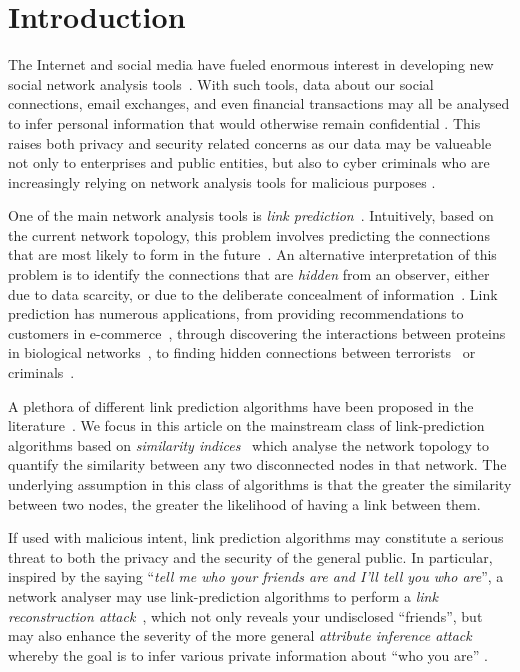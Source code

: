 \documentclass[twocolumn]{article}
\begin{document}
\section*{Introduction}
The Internet and social media have fueled enormous interest in developing new social network analysis tools~\cite{scott2012social}.
With such tools, data about our social connections, email exchanges, and even financial transactions may all be analysed to infer personal information that would otherwise remain confidential \cite{bird2006mining}. This raises both privacy and security related concerns as our data may be valueable not only to enterprises and public entities, but also to cyber criminals who are increasingly relying on network analysis tools for malicious purposes \cite{altshuler2013stealing}. 

One of the main network analysis tools is \textit{link prediction}~\cite{liben2007link,lu2011link}. Intuitively, based on the current network topology, this problem involves predicting the connections that are most likely to form in the future~\cite{liben2007link}. An alternative interpretation of this problem is to identify the connections that are \textit{hidden} from an observer, either due to data scarcity, or due to the deliberate concealment of information~\cite{brantingham2011co}. Link prediction has numerous applications, from providing recommendations to customers in e-commerce~\cite{crone2005predicting}, through discovering the interactions between proteins in biological networks~\cite{cannistraci2013link}, to finding hidden connections between terrorists~\cite{al2006link} or criminals~\cite{tayebi2011locating}. 

A plethora of different link prediction algorithms have been proposed in the literature~\cite{liben2007link,lu2011link,al2011survey}.
We focus in this article on the mainstream class of link-prediction algorithms based on \textit{similarity indices}~\cite{lu2011link} which analyse the network topology to quantify the similarity between any two disconnected nodes in that network. The underlying assumption in this class of algorithms is that the greater the similarity between two nodes, the greater the likelihood of having a link between them.

If used with malicious intent, link prediction algorithms may constitute a serious threat to both the privacy and the security of the general public.
In particular, inspired by the saying ``\emph{tell me who your friends are and I'll tell you who are}'', a network analyser may use link-prediction algorithms to perform a \textit{link reconstruction attack}~\cite{fire2013links}, which not only reveals your undisclosed ``friends'', but may also enhance the severity of the more general \textit{attribute inference attack} \cite{kumar2016improving} whereby the goal is to infer various private information about ``who you are'' \cite{Zheleva:2009:WWW,Mislove:2010}. 
\end{document}
